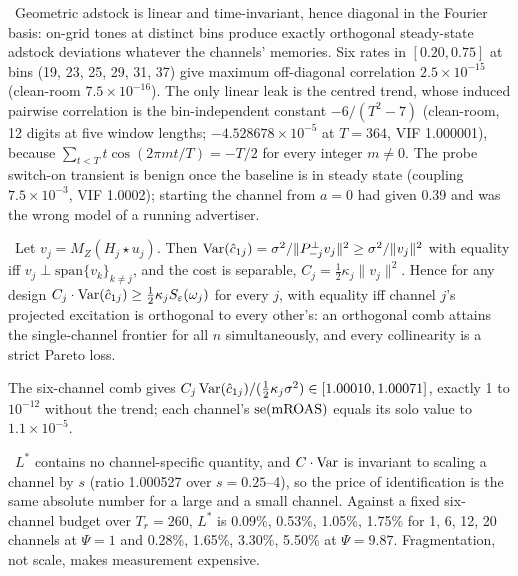 \begin{proposition}
\label{ident:prop:hetero}
\tagEstablished\ Geometric adstock is linear and time-invariant, hence diagonal in the Fourier basis: on-grid tones at distinct bins produce exactly orthogonal steady-state adstock deviations whatever the channels' memories. Six rates in $[0.20, 0.75]$ at bins (19, 23, 25, 29, 31, 37) give maximum off-diagonal correlation $2.5\times10^{-15}$ (clean-room $7.5\times10^{-16}$). The only linear leak is the centred trend, whose induced pairwise correlation is the bin-independent constant $-6/(T^2 - 7)$ (clean-room, 12 digits at five window lengths; $-4.528678\times10^{-5}$ at $T = 364$, VIF 1.000001), because $\sum_{t<T} t\cos(2\pi mt/T) = -T/2$ for every integer $m \ne 0$. The probe switch-on transient is benign once the baseline is in steady state (coupling $7.5\times10^{-3}$, VIF 1.0002); starting the channel from $a = 0$ had given 0.39 and was the wrong model of a running advertiser.
\end{proposition}

\begin{theorem}
\label{ident:thm:ncomb}
\tagEstablished\ Let $v_j = M_Z(H_j \star u_j)$. Then $\operatorname{Var}(\hat c_{1j}) = \sigma^2/\|P_{-j}^\perp v_j\|^2 \ge \sigma^2/\|v_j\|^2$ with equality iff $v_j \perp \mathrm{span}\{v_k\}_{k\ne j}$, and the cost is separable, $C_j = \tfrac12\kappa_j\|v_j\|^2$. Hence for any design $C_j\cdot\operatorname{Var}(\hat c_{1j}) \ge \tfrac12\kappa_j S_\varepsilon(\omega_j)$ for every $j$, with equality iff channel $j$'s projected excitation is orthogonal to every other's: an orthogonal comb attains the single-channel frontier for all $n$ simultaneously, and every collinearity is a strict Pareto loss.
\end{theorem}

The six-channel comb gives $C_j\operatorname{Var}(\hat c_{1j})/(\tfrac12\kappa_j\sigma^2) \in [1.00010, 1.00071]$, exactly 1 to $10^{-12}$ without the trend; each channel's $\mathrm{se}(\mathrm{mROAS})$ equals its solo value to $1.1\times10^{-5}$.

\begin{corollary}
\label{ident:cor:tax}
\tagEstablished\ $L^*$ contains no channel-specific quantity, and $C\cdot\operatorname{Var}$ is invariant to scaling a channel by $s$ (ratio 1.000527 over $s = 0.25$--4), so the price of identification is the same absolute number for a large and a small channel. Against a fixed six-channel budget over $T_r = 260$, $L^*$ is 0.09\%, 0.53\%, 1.05\%, 1.75\% for 1, 6, 12, 20 channels at $\Psi = 1$ and 0.28\%, 1.65\%, 3.30\%, 5.50\% at $\Psi = 9.87$. Fragmentation, not scale, makes measurement expensive.
\end{corollary}

